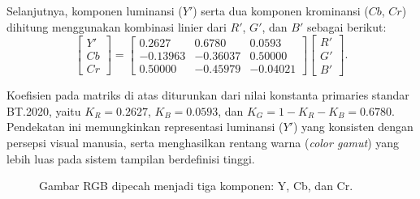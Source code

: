 \documentclass[a4paper]{article}
\begin{document}
Selanjutnya, komponen luminansi ($Y'$) serta dua komponen krominansi ($Cb$, $Cr$) dihitung menggunakan kombinasi linier dari $R'$, $G'$, dan $B'$ sebagai berikut:
\begin{equation}
  \begin{bmatrix}
    Y' \\[4pt]
    Cb \\[4pt]
    Cr
  \end{bmatrix}
  =
  \begin{bmatrix}
    0.2627   & 0.6780   & 0.0593   \\[4pt]
    -0.13963 & -0.36037 & 0.50000  \\[4pt]
    0.50000  & -0.45979 & -0.04021
  \end{bmatrix}
  \begin{bmatrix}
    R' \\[4pt]
    G' \\[4pt]
    B'
  \end{bmatrix}.
\end{equation}

Koefisien pada matriks di atas diturunkan dari nilai konstanta primaries standar BT.2020, yaitu
$K_R = 0.2627$, $K_B = 0.0593$, dan $K_G = 1 - K_R - K_B = 0.6780$.
Pendekatan ini memungkinkan representasi luminansi ($Y'$) yang konsisten dengan persepsi visual manusia,
serta menghasilkan rentang warna (\textit{color gamut}) yang lebih luas pada sistem tampilan berdefinisi tinggi.
\begin{figure}[h!]
  \centering
  \caption{Gambar RGB dipecah menjadi tiga komponen: Y, Cb, dan Cr.}
  \label{fig:rgb_to_ycbcr}
\end{figure}
\end{document}
